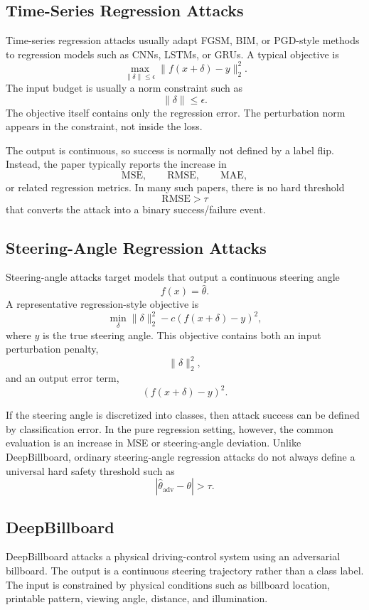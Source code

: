 \documentclass{article}
\begin{document}
\subsection{Time-Series Regression Attacks}

Time-series regression attacks usually adapt FGSM, BIM, or PGD-style methods to regression models such as CNNs, LSTMs, or GRUs. A typical objective is
\[
    \max_{\|\delta\|\leq \epsilon}
    \|f(x+\delta)-y\|_2^2.
\]
The input budget is usually a norm constraint such as
\[
    \|\delta\|\leq \epsilon.
\]
The objective itself contains only the regression error. The perturbation norm appears in the constraint, not inside the loss.

The output is continuous, so success is normally not defined by a label flip. Instead, the paper typically reports the increase in
\[
    \mathrm{MSE},
    \qquad
    \mathrm{RMSE},
    \qquad
    \mathrm{MAE},
\]
or related regression metrics. In many such papers, there is no hard threshold
\[
    \mathrm{RMSE}>\tau
\]
that converts the attack into a binary success/failure event.

\subsection{Steering-Angle Regression Attacks}

Steering-angle attacks target models that output a continuous steering angle
\[
    f(x)=\hat{\theta}.
\]
A representative regression-style objective is
\[
    \min_\delta
    \|\delta\|_2^2
    -
    c(f(x+\delta)-y)^2,
\]
where \(y\) is the true steering angle. This objective contains both an input perturbation penalty,
\[
    \|\delta\|_2^2,
\]
and an output error term,
\[
    (f(x+\delta)-y)^2.
\]

If the steering angle is discretized into classes, then attack success can be defined by classification error. In the pure regression setting, however, the common evaluation is an increase in MSE or steering-angle deviation. Unlike DeepBillboard, ordinary steering-angle regression attacks do not always define a universal hard safety threshold such as
\[
    |\hat{\theta}_{\mathrm{adv}}-\theta|>\tau.
\]

\subsection{DeepBillboard}

DeepBillboard attacks a physical driving-control system using an adversarial billboard. The output is a continuous steering trajectory rather than a class label. The input is constrained by physical conditions such as billboard location, printable pattern, viewing angle, distance, and illumination.
\end{document}
